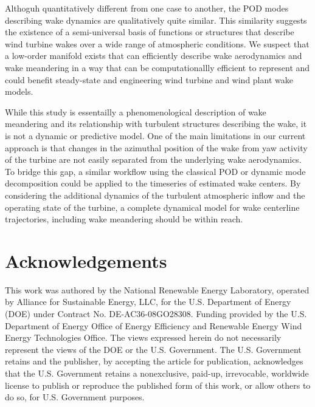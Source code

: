 \documentclass[%
 aip,
 amsmath,
 amssymb,
]{revtex4-2}
\newcommand{\comment}[1]{\textbf{\textcolor{red!50!black}{#1}}}
\begin{document}

Althoguh quantitatively different from one case to another, the POD modes describing wake dynamics are qualitatively quite similar. 
This similarity suggests the existence of a semi-universal basis of functions or structures that describe wind turbine wakes over a wide range of atmospheric conditions.
We suspect that a low-order manifold exists that can efficiently describe wake aerodynamics and wake meandering in a way that can be computationallly efficient to represent and could benefit steady-state and engineering wind turbine and wind plant wake models.

While this study is essentailly a phenomenological description of wake meandering and its relationship with turbulent structures describing the wake, it is not a dynamic or predictive model.
One of the main limitations in our current approach is that changes in the azimuthal position of the wake from yaw activity of the turbine are not easily separated from the underlying wake aerodynamics.
To bridge this gap, a similar workflow using the classical POD or dynamic mode decomposition could be applied to the timeseries of estimated wake centers.
By considering the additional dynamics of the turbulent atmospheric inflow and the operating state of the turbine, a complete dynamical model for wake centerline trajectories, including wake meandering should be within reach.


\section*{Acknowledgements}

This work was authored by the National Renewable Energy Laboratory, operated by Alliance for Sustainable Energy, LLC, for the U.S. Department of Energy (DOE) under Contract No. DE-AC36-08GO28308. Funding provided by the U.S. Department of Energy Office of Energy Efficiency and Renewable Energy Wind Energy Technologies Office. The views expressed herein do not necessarily represent the views of the DOE or the U.S. Government. The U.S. Government retains and the publisher, by accepting the article for publication, acknowledges that the U.S. Government retains a nonexclusive, paid-up, irrevocable, worldwide license to publish or reproduce the published form of this work, or allow others to do so, for U.S. Government purposes. 



\end{document}

